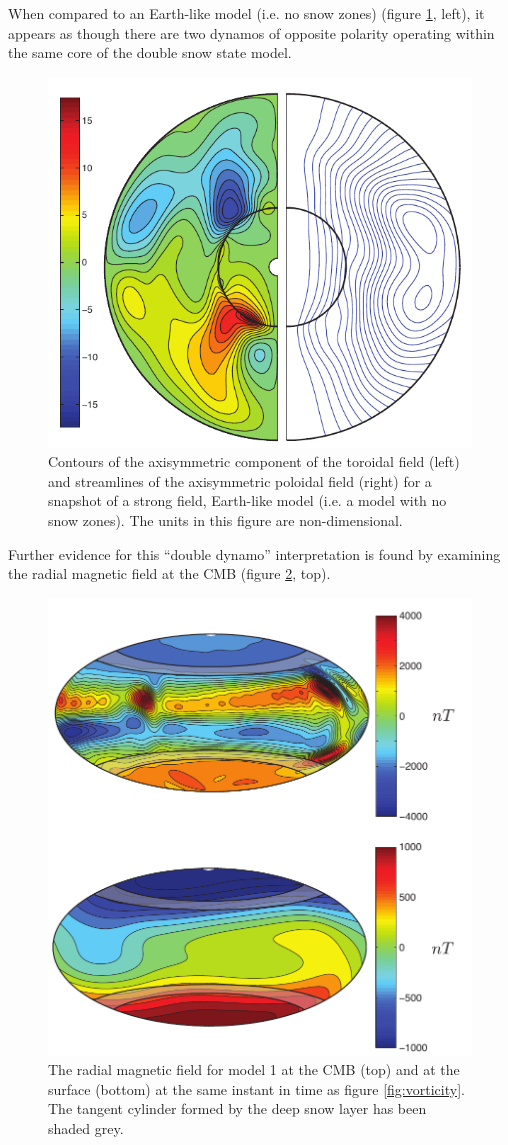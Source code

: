 %
When compared to an Earth-like model (i.e. no snow zones) (figure \ref{fig:toroidalpoloidalearth}, left), it appears as though there are two dynamos of opposite polarity operating within the same core of the double snow state model.
%
\begin{figure}
	\centering
	\noindent\includegraphics[width=.6\linewidth]{Chapter4/figures/BTorPolEarth}
	\caption{Contours of the axisymmetric component of the toroidal field (left) and streamlines of the axisymmetric poloidal field (right) for a snapshot of a strong field, Earth-like model (i.e. a model with no snow zones).  The units in this figure are non-dimensional.}
	\label{fig:toroidalpoloidalearth}
\end{figure}
%
Further evidence for this ``double dynamo'' interpretation is found by examining the radial magnetic field at the CMB (figure \ref{fig:brad}, top).
\begin{figure}
	\centering
	\noindent\includegraphics[width=\linewidth]{Chapter4/figures/Brad_dim.pdf}
	\caption{The radial magnetic field for model 1 at the CMB (top) and at  the surface (bottom) at the same instant in time as figure \ref{fig:vorticity}. The tangent cylinder formed by the deep snow layer has been shaded grey. }
	\label{fig:brad}
\end{figure}
